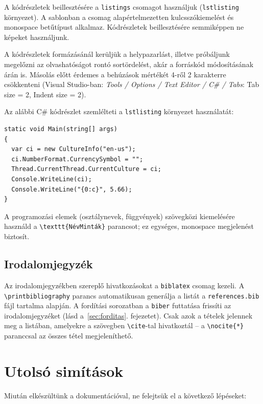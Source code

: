 A kódrészletek beillesztésére a \texttt{listings} csomagot használjuk
(\texttt{lstlisting} környezet). A sablonban a csomag alapértelmezetten
kulcsszókiemelést és monospace betűtípust alkalmaz. Kódrészletek
beillesztésére semmiképpen ne képeket használjunk.

A kódrészletek formázásánál kerüljük a helypazarlást, illetve próbáljunk
megelőzni az olvashatóságot rontó sortördelést, akár a forráskód módosításának
árán is. Másolás előtt érdemes a behúzások mértékét 4-ről 2 karakterre
csökkenteni (Visual Studio-ban: \textit{Tools / Options / Text Editor / C\# /
Tabs}: Tab size = 2, Indent size = 2).

Az alábbi C\# kódrészlet szemlélteti a \texttt{lstlisting} környezet
használatát:

\begin{lstlisting}[language={[Sharp]C}]
static void Main(string[] args)
{
  var ci = new CultureInfo("en-us");
  ci.NumberFormat.CurrencySymbol = "";
  Thread.CurrentThread.CurrentCulture = ci;
  Console.WriteLine(ci);
  Console.WriteLine("{0:c}", 5.66);
}
\end{lstlisting}

A programozási elemek (osztálynevek, függvények) szövegközi kiemelésére
használd a \verb|\texttt{NévMinták}| parancsot; ez egységes, monospace
megjelenést biztosít.

\subsection{Irodalomjegyzék}

Az irodalomjegyzékben szereplő hivatkozásokat a \texttt{biblatex} csomag kezeli.
A \verb|\printbibliography| parancs automatikusan generálja a listát a
\texttt{references.bib} fájl tartalma alapján. A fordítási sorozatban a
\texttt{biber} futtatása frissíti az irodalomjegyzéket (lásd a~\ref{sec:forditas}.
fejezetet). Csak azok a tételek jelennek meg a listában, amelyekre a szövegben
\verb|\cite|-tal hivatkoztál -- a \verb|\nocite{*}| paranccsal az összes tétel
megjeleníthető.

\section{Utolsó simítások}

Miután elkészültünk a dokumentációval, ne felejtsük el a következő lépéseket:

